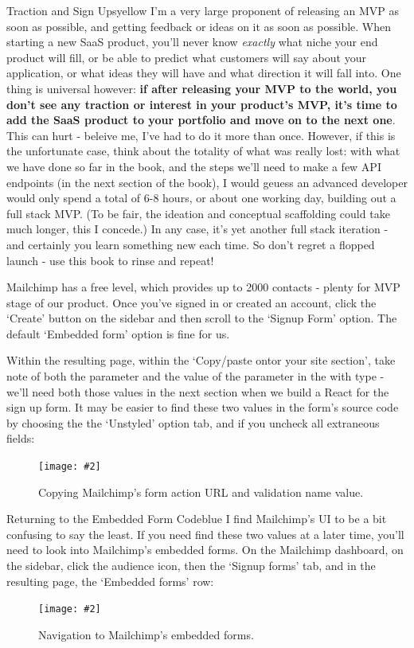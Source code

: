 \documentclass[a4paper,headinclude=on,footinclude=on,12pt,oneside]{scrbook}
\newcommand{\standardfigure}[3]{\begin{figure}[H]\begin{center}\texttt{[image: \#2]}\caption{#3}\label{fig:#2}\end{center}\end{figure}}
\begin{document}
\begin{highlightBox}{Traction and Sign Ups}{yellow}{\warning}
I'm a very large proponent of releasing an MVP as soon as possible, and getting feedback or ideas on it as soon as possible. When starting a new SaaS product, you'll never know \textit{exactly} what niche your end product will fill, or be able to predict what customers will say about your application, or what ideas they will have and what direction it will fall into. One thing is universal however: \textbf{if after releasing your MVP to the world, you don't see any traction or interest in your product's MVP, it's time to add the SaaS product to your portfolio and move on to the next one}. This can hurt - beleive me, I've had to do it more than once. However, if this is the unfortunate case, think about the totality of what was really lost: with what we have done so far in the book, and the steps we'll need to make a few API endpoints (in the next section of the book), I would geuess an advanced developer would only spend a total of 6-8 hours, or about one working day, building out a full stack MVP. (To be fair, the ideation and conceptual scaffolding could take much longer, this I concede.) In any case, it's yet another full stack iteration - and certainly you learn something new each time. So don't regret a flopped launch - use this book to rinse and repeat!
\end{highlightBox}


Mailchimp has a free level, which provides up to 2000 contacts - plenty for MVP stage of our product. Once you've signed in or created an account, click the `Create' button on the sidebar and then scroll to the `Signup Form' option. The default `Embedded form' option is fine for us. 

Within the resulting page, within the `Copy/paste ontor your site section', take note of both the  parameter and the value of the  parameter in the  with type  - we'll need both those values in the next section when we build a React for the sign up form. It may be easier to find these two values in the form's source code by choosing the the `Unstyled' option tab, and if you uncheck all extraneous fields:

\standardfigure{\textwidth}{frontend/mailchimp/finding-form-field-values}{Copying Mailchimp's form action URL and validation name value.}

\begin{highlightBox}{Returning to the Embedded Form Code}{blue}{\information}
I find Mailchimp's UI to be a bit confusing to say the least. If you need find these two values at a later time, you'll need to look into Mailchimp's embedded forms. On the Mailchimp dashboard, on the sidebar, click the audience icon, then the `Signup forms' tab, and in the resulting page, the `Embedded forms' row:

\standardfigure{\textwidth}{frontend/mailchimp/navigation-to-embedded-forms}{Navigation to Mailchimp's embedded forms.}

\end{highlightBox}
\end{document}
